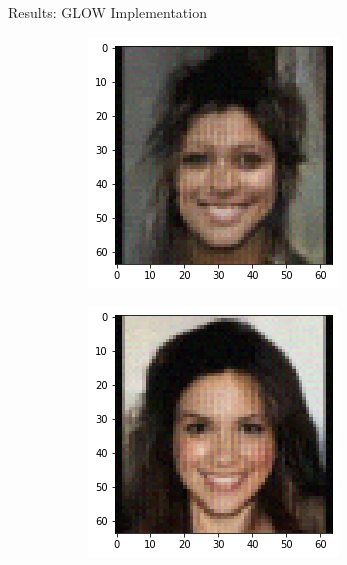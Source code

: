 \begin{frame}{Results: GLOW Implementation}
    \begin{figure}[htbp!]
     \centering
     \begin{subfigure}[b]{0.3\textwidth}
         \centering
         \includegraphics[width=\textwidth]{Images/celeb_sample.png}
     \end{subfigure} 
     \hfill
     \begin{subfigure}[b]{0.3\textwidth}
         \centering
         \includegraphics[width=\textwidth]{Images/celeb_sample2.png}

\end{subfigure}
\end{figure}
\end{frame}
